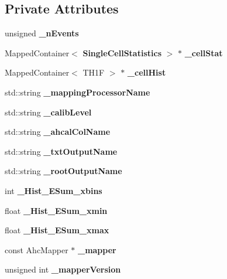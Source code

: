 \subsection*{Private Attributes}
\begin{DoxyCompactItemize}
\item 
unsigned {\bfseries \_\-nEvents}\label{classCALICE_1_1SingleCellAnalysis_a99f44821b039d92c25bf7b13bf4778bc}

\item 
MappedContainer$<$ {\bf SingleCellStatistics} $>$ $\ast$ {\bfseries \_\-cellStat}\label{classCALICE_1_1SingleCellAnalysis_a42a5e7563ad65e0eebf4a0108da517c8}

\item 
MappedContainer$<$ TH1F $>$ $\ast$ {\bfseries \_\-cellHist}\label{classCALICE_1_1SingleCellAnalysis_ae4c707658817e2de1b67ac8c348ebf7f}

\item 
std::string {\bfseries \_\-mappingProcessorName}\label{classCALICE_1_1SingleCellAnalysis_afc6fc973e6a22a2ca0003076f7c3345b}

\item 
std::string {\bfseries \_\-calibLevel}\label{classCALICE_1_1SingleCellAnalysis_a8b30b37473b52f887be5a30806fcd471}

\item 
std::string {\bfseries \_\-ahcalColName}\label{classCALICE_1_1SingleCellAnalysis_af2763329df8455f7475bdd0d46fdf22f}

\item 
std::string {\bfseries \_\-txtOutputName}\label{classCALICE_1_1SingleCellAnalysis_a23feaeb7047a6b87370dd9870385c24c}

\item 
std::string {\bfseries \_\-rootOutputName}\label{classCALICE_1_1SingleCellAnalysis_a399a21983ff24615e85f186dd59020a1}

\item 
int {\bfseries \_\-Hist\_\-ESum\_\-xbins}\label{classCALICE_1_1SingleCellAnalysis_ab136d1bac5cce09b328aadcab013468d}

\item 
float {\bfseries \_\-Hist\_\-ESum\_\-xmin}\label{classCALICE_1_1SingleCellAnalysis_a0d9fe5ae453a208f089f36b7b1ebdc22}

\item 
float {\bfseries \_\-Hist\_\-ESum\_\-xmax}\label{classCALICE_1_1SingleCellAnalysis_a51a9aa087d66f118aa914f062c9b9fee}

\item 
const AhcMapper $\ast$ {\bfseries \_\-mapper}\label{classCALICE_1_1SingleCellAnalysis_a385a9c5bbbb3d62c2d0741934d064a03}

\item 
unsigned int {\bfseries \_\-mapperVersion}\label{classCALICE_1_1SingleCellAnalysis_a5c6a21d4d86ac54e6039504f97ba741e}

\end{DoxyCompactItemize}


